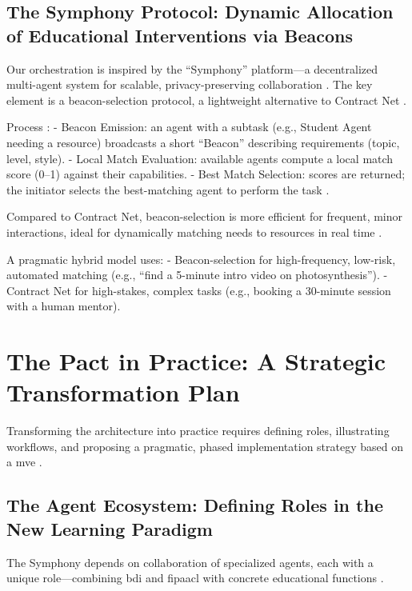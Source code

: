 \documentclass[12pt,a4paper]{article}
\begin{document}
\subsection{The Symphony Protocol: Dynamic Allocation of Educational Interventions via Beacons}
Our orchestration is inspired by the \enquote{Symphony} platform---a decentralized multi-agent system for scalable, privacy-preserving collaboration \autocite{wang2025,moonlight_symphony,emergent_mind,wang2025_2}. The key element is a beacon-selection protocol, a lightweight alternative to Contract Net \autocite{emergent_mind}.

Process \autocite{wang2025,moonlight_symphony}:
- Beacon Emission: an agent with a subtask (e.g., Student Agent needing a resource) broadcasts a short \enquote{Beacon} describing requirements (topic, level, style).
- Local Match Evaluation: available agents compute a local match score (0--1) against their capabilities.
- Best Match Selection: scores are returned; the initiator selects the best-matching agent to perform the task \autocite{moonlight_symphony}.

Compared to Contract Net, beacon-selection is more efficient for frequent, minor interactions, ideal for dynamically matching needs to resources in real time \autocite{emergent_mind}.

A pragmatic hybrid model uses:
- Beacon-selection for high-frequency, low-risk, automated matching (e.g., \enquote{find a 5-minute intro video on photosynthesis}).
- Contract Net for high-stakes, complex tasks (e.g., booking a 30-minute session with a human mentor).

\section{The Pact in Practice: A Strategic Transformation Plan}
Transforming the architecture into practice requires defining roles, illustrating workflows, and proposing a pragmatic, phased implementation strategy based on a \gls{mve} \autocite{adner2023,adner2023_2,msg_advisors,audi_weihe}.

\subsection{The Agent Ecosystem: Defining Roles in the New Learning Paradigm}
The Symphony depends on collaboration of specialized agents, each with a unique role---combining \gls{bdi} and \gls{fipaacl} with concrete educational functions \autocite{georgeff1998,wiki_bdi,rao_bdi,zhao2025}.
\end{document}
